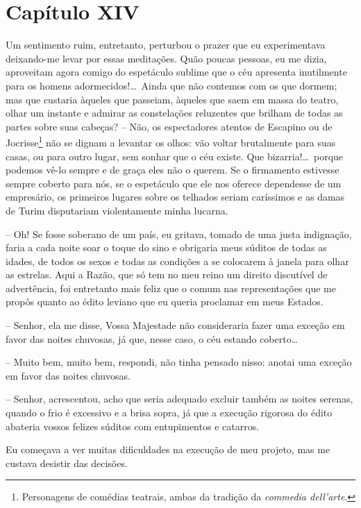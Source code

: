 \section{Capítulo XIV}

 Um sentimento ruim, entretanto, perturbou o prazer que eu experimentava
deixando-me levar por essas meditações. Quão poucas pessoas, eu me
dizia, aproveitam agora comigo do espetáculo sublime que o céu
apresenta inutilmente para os homens adormecidos!\ldots\ Ainda que não
contemos com os que dormem; mas que custaria àqueles que passeiam,
àqueles que saem em massa do teatro, olhar um instante e admirar as
constelações reluzentes que brilham de todas as partes sobre suas
cabeças? -- Não, os espectadores atentos de Escapino ou de
Jocrisse\footnote{ Personagens de comédias teatrais, ambas da tradição
da \textit{commedia dell’arte}.} não se dignam a levantar os olhos:
vão voltar brutalmente para suas casas, ou para outro lugar, sem sonhar
que o céu existe. Que bizarria!\ldots\ porque podemos vê-lo sempre e de
graça eles não o querem. Se o firmamento estivesse sempre coberto para
nós, se o espetáculo que ele nos oferece dependesse de um empresário,
os primeiros lugares sobre os telhados seriam caríssimos e as damas de
Turim disputariam violentamente minha lucarna.

 -- Oh! Se fosse soberano de um país, eu gritava, tomado de uma justa
indignação, faria a cada noite soar o toque do sino e obrigaria meus
súditos de todas as idades, de todos os sexos e todas as condições a se
colocarem à janela para olhar as estrelas. Aqui a Razão, que só tem no
meu reino um direito discutível de advertência, foi entretanto mais
feliz que o comum nas representações que me propôs quanto ao édito
leviano que eu queria proclamar em meus Estados. 

-- Senhor, ela me disse, Vossa Majestade não consideraria fazer uma
exceção em favor das noites chuvosas, já que, nesse caso, o céu estando
coberto\ldots\ 

-- Muito bem, muito bem, respondi, não tinha pensado nisso: anotai uma
exceção em favor das noites chuvosas. 

-- Senhor, acrescentou, acho que seria adequado excluir também as
noites serenas, quando o frio é excessivo e a brisa sopra, já que a
execução rigorosa do édito abateria vossos felizes súditos com
entupimentos e catarros. 

Eu começava a ver muitas dificuldades na execução de meu projeto, mas me
custava desistir das decisões. 

